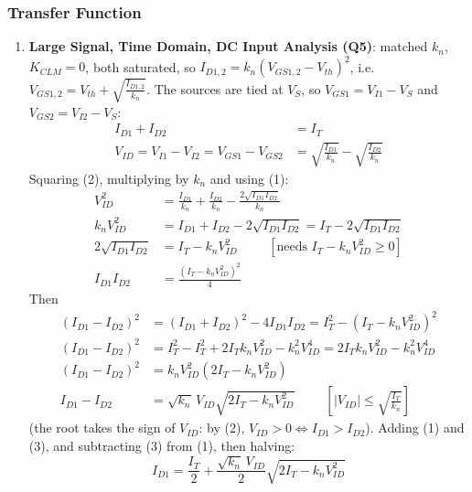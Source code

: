 \subsubsection{Transfer Function}
\begin{enumerate}
  \item \textbf{Large Signal, Time Domain, DC Input Analysis (Q5)}:
    matched \(k_n\), \(K_{CLM} = 0\), both saturated, so
    \(I_{D1,2} = k_n (V_{GS1,2} - V_{th})^2\), i.e.
    \(V_{GS1,2} = V_{th} + \sqrt{\frac{I_{D1,2}}{k_n}}\). The sources are tied at
    \(V_S\), so \(V_{GS1} = V_{I1} - V_S\) and \(V_{GS2} = V_{I2} - V_S\):
    \begin{align*}
      I_{D1} + I_{D2} &= I_T \tag{1} \\
      V_{ID} = V_{I1} - V_{I2} = V_{GS1} - V_{GS2} &= \sqrt{\frac{I_{D1}}{k_n}} - \sqrt{\frac{I_{D2}}{k_n}} \tag{2}
    \end{align*}
    Squaring (2), multiplying by \(k_n\) and using (1):
    \begin{align*}
      V_{ID}^2 &= \frac{I_{D1}}{k_n} + \frac{I_{D2}}{k_n} - \frac{2\sqrt{I_{D1} I_{D2}}}{k_n} \\
      k_n V_{ID}^2 &= I_{D1} + I_{D2} - 2\sqrt{I_{D1} I_{D2}} = I_T - 2\sqrt{I_{D1} I_{D2}} \\
      2\sqrt{I_{D1} I_{D2}} &= I_T - k_n V_{ID}^2 \hspace{1cm} [\text{needs } I_T - k_n V_{ID}^2 \geq 0] \\
      I_{D1} I_{D2} &= \frac{(I_T - k_n V_{ID}^2)^2}{4}
    \end{align*}
    Then
    \begin{align*}
      (I_{D1} - I_{D2})^2 &= (I_{D1} + I_{D2})^2 - 4 I_{D1} I_{D2} = I_T^2 - (I_T - k_n V_{ID}^2)^2 \\
      (I_{D1} - I_{D2})^2 &= I_T^2 - I_T^2 + 2 I_T k_n V_{ID}^2 - k_n^2 V_{ID}^4 = 2 I_T k_n V_{ID}^2 - k_n^2 V_{ID}^4 \\
      (I_{D1} - I_{D2})^2 &= k_n V_{ID}^2 (2 I_T - k_n V_{ID}^2) \\
      I_{D1} - I_{D2} &= \sqrt{k_n}\, V_{ID} \sqrt{2 I_T - k_n V_{ID}^2} \hspace{1cm} \left[|V_{ID}| \leq \sqrt{\tfrac{I_T}{k_n}}\right] \tag{3}
    \end{align*}
    (the root takes the sign of \(V_{ID}\): by (2), \(V_{ID} > 0 \Leftrightarrow I_{D1} > I_{D2}\)).
    Adding (1) and (3), and subtracting (3) from (1), then halving:
    \[
      I_{D1} = \frac{I_T}{2} + \frac{\sqrt{k_n}\, V_{ID}}{2}\sqrt{2 I_T - k_n V_{ID}^2}
\]
\end{enumerate}
